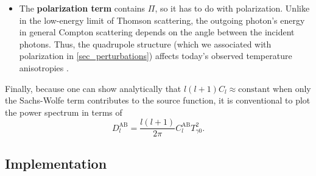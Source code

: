 \documentclass[10pt,a4paper]{article}
\begin{document}
\begin{itemize}
\item
The \textbf{polarization term} contains $\Pi$, so it has to do with polarization.
Unlike in the low-energy limit of Thomson scattering,
the outgoing photon's energy in general Compton scattering
depends on the angle between the incident photons.
Thus, the quadrupole structure (which we associated with polarization in \cref{sec_perturbations})
affects today's observed temperature anisotropies \cite[section 2.1]{kableDeconstructingPlanckTT2020}.
\end{itemize}

Finally, because one can show analytically that $l (l+1) C_l \approx \text{constant}$
when only the Sachs-Wolfe term contributes to the source function,
it is conventional to plot the power spectrum in terms of
\begin{equation}
	D_l^\text{AB} = \frac{l (l+1)}{2 \pi} C_l^\text{AB} T_{\gamma 0}^2 .
\label{eq_Dl}
\end{equation}

\subsection{Implementation}
\end{document}
